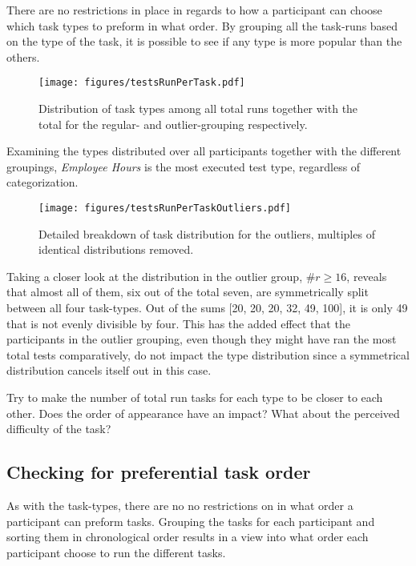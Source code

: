     There are no restrictions in place in regards to how a participant
    can choose which task types to preform in what order. By grouping all
    the task-runs based on the type of the task, it is possible to see if
    any type is more popular than the others.

    \begin{figure}[h!]
      \centering
      \texttt{[image: figures/testsRunPerTask.pdf]}
      \caption{
        Distribution of task types among all total runs together with the
        total for the regular- and outlier-grouping respectively.
      }
    \end{figure}

    Examining the types distributed over all participants together
    with the different groupings, \textit{Employee Hours} is the most
    executed test type, regardless of categorization.

    \begin{figure}[h!]
      \centering
      \texttt{[image: figures/testsRunPerTaskOutliers.pdf]}
      \caption{
        Detailed breakdown of task distribution for the outliers, multiples
        of identical distributions removed.
      }
      \label{label_testsRunPerTaskOutliers}
    \end{figure}

    Taking a closer look at the distribution in the outlier group,
    $\#r\geq16$, reveals that almost all of them, six out of the total seven,
    are symmetrically split between all four task-types. Out of the sums
    [20, 20, 20, 32, 49, 100], it is only 49 that is not evenly divisible
    by four. This has the added effect that the participants in the
    outlier grouping, even though they might have ran the most total tests
    comparatively, do not impact the type distribution since a symmetrical
    distribution cancels itself out in this case.

		\iterchange
		Try to make the number of total run tasks for each type to be  closer to
		each other. Does the order of appearance have an impact? What about the
		perceived difficulty of the task?

  \subsection{Checking for preferential task order}


    As with the task-types, there are no no restrictions on in what order a
    participant can preform tasks. Grouping the tasks for each participant
    and sorting them in chronological order results in a view into what
    order each participant choose to run the different tasks.

